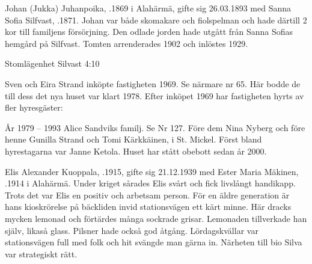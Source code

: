 Johan (Jukka) Juhanpoika, .1869 i Alahärmä, gifte sig 26.03.1893 med Sanna Sofia Silfvast, .1871. Johan var både skomakare och fiolspelman och hade därtill 2 kor till familjens försörjning. Den odlade jorden hade utgått från Sanna Sofias hemgård på Silfvast. Tomten arrenderades 1902 och inlöstes 1929.
\begin{jhchildren}
  \item {}
  \item {}
  \item {}
  \item {}
  \item {}
  \item {}
\end{jhchildren}



Stomlägenhet Silvast 4:10

Sven och Eira Strand inköpte fastigheten 1969. Se närmare nr 65. Här bodde de till dess det nya huset var klart 1978. Efter inköpet 1969 har fastigheten hyrts av fler hyresgäster:

År 1979 – 1993  Alice Sandviks familj. Se Nr 127. Före dem Nina Nyberg och före henne Gunilla Strand och Tomi Kärkkäinen,  i St. Mickel. Först bland hyrestagarna var Janne Ketola. Huset har stått obebott sedan år 2000.



Elis Alexander Kuoppala, .1915, gifte sig 21.12.1939 med Ester Maria Mäkinen, .1914 i Alahärmä. Under kriget sårades Elis svårt och fick livslångt handikapp. Trots det var Elis en positiv och arbetsam person. För en äldre generation är hans kioskrörelse på bäckliden invid stationsvägen ett kärt minne. Här dracks mycken lemonad och förtärdes många sockrade grisar. Lemonaden tillverkade han själv, likaså glass. Pilsner hade också god åtgång. Lördagskvällar var stationsvägen full med folk och hit svängde man gärna in. Närheten till bio Silva var strategiskt rätt.


